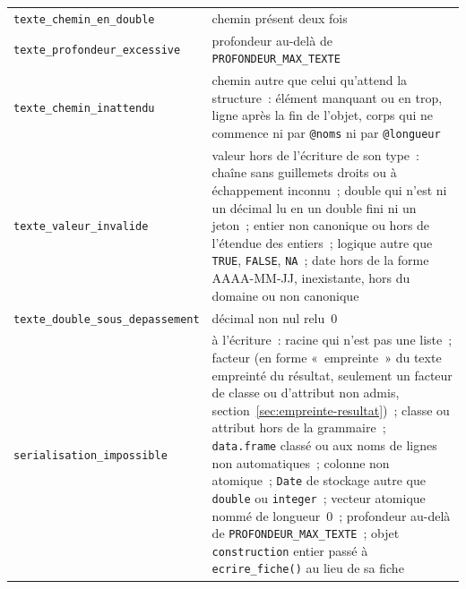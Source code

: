 \documentclass[a4paper,11pt]{article}
\newcommand{\code}[1]{\texttt{\small #1}}
\begin{document}
\begin{center}
\begin{longtable}{@{}p{5.4cm}p{9.4cm}@{}}
\code{texte\_chemin\_en\_double} & chemin présent deux fois \\
\code{texte\_profondeur\_excessive} & profondeur au-delà de \code{PROFONDEUR\_MAX\_TEXTE} \\
\code{texte\_chemin\_inattendu} & chemin autre que celui qu'attend la structure~: élément manquant ou en trop, ligne après la fin de l'objet, corps qui ne commence ni par \code{@noms} ni par \code{@longueur} \\
\code{texte\_valeur\_invalide} & valeur hors de l'écriture de son type~: chaîne sans guillemets droits ou à échappement inconnu~; double qui n'est ni un décimal lu en un double fini ni un jeton~; entier non canonique ou hors de l'étendue des entiers~; logique autre que \code{TRUE}, \code{FALSE}, \code{NA}~; date hors de la forme AAAA-MM-JJ, inexistante, hors du domaine ou non canonique \\
\code{texte\_double\_sous\_depassement} & décimal non nul relu~0 \\
\code{serialisation\_impossible} & à l'écriture~: racine qui n'est pas une liste~; facteur (en forme «~empreinte~» du texte empreinté du résultat, seulement un facteur de classe ou d'attribut non admis, section~\ref{sec:empreinte-resultat})~; classe ou attribut hors de la grammaire~; \code{data.frame} classé ou aux noms de lignes non automatiques~; colonne non atomique~; \code{Date} de stockage autre que \code{double} ou \code{integer}~; vecteur atomique nommé de longueur~0~; profondeur au-delà de \code{PROFONDEUR\_MAX\_TEXTE}~; objet \code{construction} entier passé à \code{ecrire\_fiche()} au lieu de sa fiche \\
\end{longtable}
\end{center}
\end{document}
